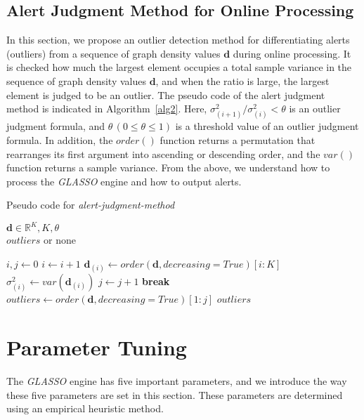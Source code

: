 \documentclass[conference]{IEEEtran}
\begin{document}
\subsection{Alert Judgment Method for Online Processing}
In this section, we propose an outlier detection method for differentiating alerts (outliers) from a sequence of graph density values $\bm{d}$ during online processing.
It is checked how much the largest element occupies a total sample variance in the sequence of graph density values $\bm{d}$, and when the ratio is large, the largest element is judged to be an outlier.
The pseudo code of the alert judgment method is indicated in Algorithm~\ref{alg2}.
Here, $\sigma^{2}_{(i+1)}/\sigma^{2}_{(i)}<\theta$ is an outlier judgment formula, and $\theta \, (0\leq \theta \leq 1)$ is a threshold value of an outlier judgment formula.
In addition, the $order()$ function returns a permutation that rearranges its first argument into ascending or descending order, and the $var()$ function returns a sample variance.
From the above, we understand how to process the \textit{GLASSO} engine and how to output alerts.


\begin{algorithm}[tb]
\caption{Pseudo code for \textit{alert-judgment-method}}
\label{alg2}
\begin{algorithmic}[1]
  \REQUIRE $\bm{d}\in\mathbb{R}^{K}, K, \theta$\\
  \ENSURE $outliers$ or none

  \STATE $i, j \gets 0$
    \STATE $i \gets i + 1$
    \STATE $\bm{d}_{(i)} \gets order(\bm{d}, decreasing=True)[i:K]$
    \STATE $\sigma_{(i)}^2 \gets var(\bm{d}_{(i)})$
      \STATE $j \gets j + 1$
      \STATE \textbf{break}
    \ELSE
      \STATE $outliers \gets order(\bm{d}, decreasing=True)[1:j]$
      \RETURN $outliers$
    \ENDIF
  \ENDWHILE
\end{algorithmic}
\end{algorithm}



\section{Parameter Tuning}
\label{Parameter}
The \textit{GLASSO} engine has five important parameters, and we introduce the way these five parameters are set in this section.
These parameters are determined using an empirical heuristic method.
\end{document}
